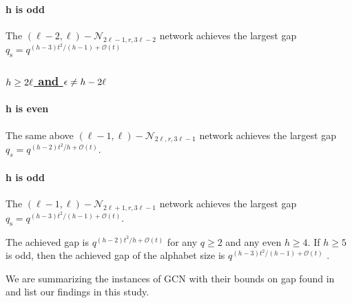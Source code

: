 \paragraph{h is odd}

The $\left(\ell-2,\ell\right)-\mathcal{N}_{2\ell-1,r,3\ell-2}$ network
achieves the largest gap $q_{\mathrm{s}}=q^{\left(h-3\right)t^{2}/\left(h-1\right)+\mathcal{O}(t)}$

\subsubsection{\uline{\mbox{$h\protect\geq2\ell$} and \mbox{$\epsilon\protect\neq h-2\ell$}}}

\paragraph{h is even}

The same above $\left(\ell-1,\ell\right)-\mathcal{N}_{2\ell,r,3\ell-1}$
network achieves the largest gap $q_{s}=q^{(h-2)t^{2}/h+\mathcal{O}(t)}$.

\paragraph{h is odd}

The $\left(\ell-1,\ell\right)-\mathcal{N}_{2\ell+1,r,3\ell-1}$ network
achieves the largest gap $q_{\mathrm{s}}=q^{(h-3)t^{2}/\left(h-1\right)+\mathcal{O}(t)}$.
\begin{rem}
The achieved gap is $q^{(h-2)t^{2}/h+\mathcal{O}(t)}$ for any $q\geq2$
and any even $h\geq4$. If $h\geq5$ is odd, then the achieved gap
of the alphabet size is $q^{(h-3)t^{2}/\left(h-1\right)+\mathcal{O}(t)}$
\cite{Wachter-Zeh:2018}.
\end{rem}
We are summarizing the instances of GCN with their bounds on gap found
in \cite{Wachter-Zeh:2018} and list our findings in this study.

